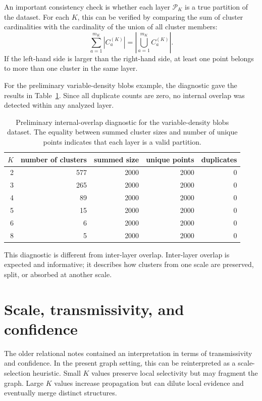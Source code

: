 \documentclass[pdflatex,sn-mathphys-num]{sn-jnl}
\theoremstyle{thmstyleone}
\theoremstyle{thmstyletwo}
\theoremstyle{thmstylethree}
\newcommand{\calP}{\mathcal{P}}
\begin{document}
An important consistency check is whether each layer $\calP_K$ is a true partition of the dataset. For each $K$, this can be verified by comparing the sum of cluster cardinalities with the cardinality of the union of all cluster members:
\begin{equation}
\sum_{a=1}^{m_K}|C_a^{(K)}|=\left|\bigcup_{a=1}^{m_K}C_a^{(K)}\right|.
\label{eq:partition_check}
\end{equation}
If the left-hand side is larger than the right-hand side, at least one point belongs to more than one cluster in the same layer.

For the preliminary variable-density blobs example, the diagnostic gave the results in Table~\ref{tab:partition_diagnostic}. Since all duplicate counts are zero, no internal overlap was detected within any analyzed layer.

\begin{table}[t]
\caption{Preliminary internal-overlap diagnostic for the variable-density blobs dataset. The equality between summed cluster sizes and number of unique points indicates that each layer is a valid partition.}\label{tab:partition_diagnostic}
\centering
\begin{tabular}{rrrrr}
\toprule
$K$ & number of clusters & summed size & unique points & duplicates\\
\midrule
2 & 577 & 2000 & 2000 & 0\\
3 & 265 & 2000 & 2000 & 0\\
4 & 89  & 2000 & 2000 & 0\\
5 & 15  & 2000 & 2000 & 0\\
6 & 6   & 2000 & 2000 & 0\\
8 & 5   & 2000 & 2000 & 0\\
\bottomrule
\end{tabular}
\end{table}

This diagnostic is different from inter-layer overlap. Inter-layer overlap is expected and informative; it describes how clusters from one scale are preserved, split, or absorbed at another scale.

\section{Scale, transmissivity, and confidence}\label{sec:scale}

The older relational notes contained an interpretation in terms of transmissivity and confidence. In the present graph setting, this can be reinterpreted as a scale-selection heuristic. Small $K$ values preserve local selectivity but may fragment the graph. Large $K$ values increase propagation but can dilute local evidence and eventually merge distinct structures.
\end{document}
